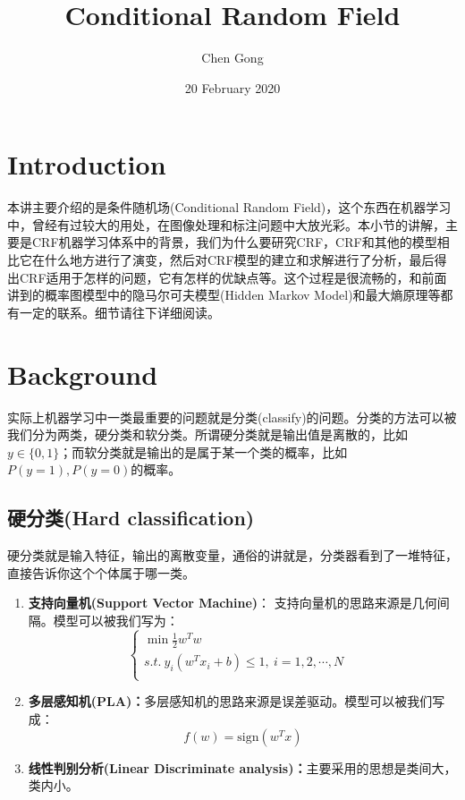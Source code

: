 \documentclass[a4paper]{article}
\title{Conditional Random Field}
\author{Chen Gong}
\date{20 February 2020}
\begin{document}
\maketitle
\tableofcontents
\newpage
\setcounter{page}{1} %
\clearpage
\section{Introduction}
本讲主要介绍的是条件随机场(Conditional Random Field)，这个东西在机器学习中，曾经有过较大的用处，在图像处理和标注问题中大放光彩。本小节的讲解，主要是CRF机器学习体系中的背景，我们为什么要研究CRF，CRF和其他的模型相比它在什么地方进行了演变，然后对CRF模型的建立和求解进行了分析，最后得出CRF适用于怎样的问题，它有怎样的优缺点等。这个过程是很流畅的，和前面讲到的概率图模型中的隐马尔可夫模型(Hidden Markov Model)和最大熵原理等都有一定的联系。细节请往下详细阅读。

\section{Background}
实际上机器学习中一类最重要的问题就是分类(classify)的问题。分类的方法可以被我们分为两类，硬分类和软分类。所谓硬分类就是输出值是离散的，比如$y\in \{0,1\}$；而软分类就是输出的是属于某一个类的概率，比如$P(y=1),P(y=0)$的概率。
\subsection{硬分类(Hard classification)}
硬分类就是输入特征，输出的离散变量，通俗的讲就是，分类器看到了一堆特征，直接告诉你这个个体属于哪一类。
\begin{enumerate}
    \item \textbf{支持向量机(Support Vector Machine)}：
{\color{red}支持向量机的思路来源是几何间隔}。模型可以被我们写为：
\begin{equation}
    \left\{
    \begin{array}{ll}
      \min \frac{1}{2} w^Tw & \\
      s.t. \ y_i(w^Tx_i+b) \leq 1, \ i=1,2,\cdots,N & \\
    \end{array}
    \right.
\end{equation}

\item \textbf{多层感知机(PLA)：}{\color{red}多层感知机的思路来源是误差驱动}。模型可以被我们写成：
$$f(w) = \mathrm{sign}(w^Tx)$$

\item \textbf{线性判别分析(Linear Discriminate analysis)：}{\color{red}主要采用的思想是类间大，类内小。}
\end{enumerate}
\end{document}
